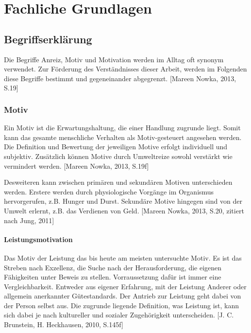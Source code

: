 \section{Fachliche Grundlagen} %
\label{sub:einordnung_und_definition}

\subsection{Begriffserklärung} %
\label{ssub:E-Entrepreneurship}
Die Begriffe Anreiz, Motiv und Motivation werden im Alltag oft synonym verwendet. Zur Förderung des Verständnisses dieser Arbeit, werden im Folgenden diese Begriffe bestimmt und gegeneinander abgegrenzt. [Mareen Nowka, 2013, S.19]

\subsubsection{Motiv} %
\label{ssub:E_Entrepreneurial_branding}
Ein Motiv ist die Erwartungshaltung, die einer Handlung zugrunde liegt. Somit kann das gesamte menschliche Verhalten als Motiv-gesteuert angesehen werden. Die Definition und Bewertung der jeweiligen Motive erfolgt individuell und subjektiv. Zusätzlich können Motive durch Umweltreize sowohl verstärkt wie vermindert werden. [Mareen Nowka, 2013, S.19f]

Desweiteren kann zwischen primären und sekundären Motiven unterschieden werden. Erstere werden durch physiologische Vorgänge im Organismus hervorgerufen, z.B. Hunger und Durst. Sekundäre Motive hingegen sind von der Umwelt erlernt, z.B. das Verdienen von Geld. [Mareen Nowka, 2013, S.20, zitiert nach Jung, 2011]


\paragraph{Leistungsmotivation} %
\label{ssub:der_Markenbegriff}
Das Motiv der Leistung das bis heute am meisten untersuchte Motiv. Es ist das Streben nach Exzellenz, die Suche nach der Herausforderung, die eigenen Fähigkeiten unter Beweis zu stellen. Vorraussetzung dafür ist immer eine Vergleichbarkeit. Entweder aus eigener Erfahrung, mit der Leistung Anderer oder allgemein anerkannter Gütestandards. Der Antrieb zur Leistung geht dabei von der Person selbst aus. Die zugrunde liegende Definition, was Leistung ist, kann sich dabei je nach kultureller und sozialer Zugehörigkeit unterscheiden. [J. C. Brunstein, H. Heckhausen, 2010, S.145f]

